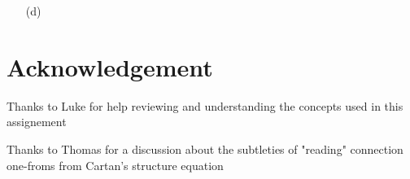 \documentclass[10pt, a4paper]{article}
\begin{document}
{\begin{enumerate}
\begin{align*}
    &=
    \begin{pmatrix}
      0 & H\underline{\omega}^2 \wedge(-B \underline{\omega}^2) + H\underline{\omega}^3 \wedge (-A\underline{\omega}^1)  & H\underline{\omega}^1 \wedge(B \underline{\omega}^2) + H\underline{\omega}^3 \wedge(-A \underline{\omega}^2) & 0\\
      A\underline{\omega}^1 \wedge(H\underline{\omega}^3) & 0 & H\underline{\omega}^1 \wedge(H\underline{\omega}^2) + A\underline{\omega}^1 \wedge(-A \underline{\omega}^2) & H \underline{\omega}^1\wedge(H \underline{\omega}^3)\\
      -B \underline{\omega}^2\wedge(H\underline{\omega}^1) + A\underline{\omega}^2 \wedge(H \underline{\omega}^3) & H \underline{\omega}^2\wedge(H \underline{\omega}^1) + A\underline{\omega}^2\wedge(-A \underline{\omega}^1) & 0 & H\underline{\omega}^2\wedge(H \underline{\omega}^3) -B \underline{\omega}^2 \wedge(A \underline{\omega}^1)\\
      0 & H\underline{\omega}^3\wedge(H \underline{\omega}^1) & H \underline{\omega}^3\wedge(H\underline{\omega}^2) - A\underline{\omega}^1\wedge(B\underline{\omega}^2) & 0
    \end{pmatrix}\\
    &=
    \begin{pmatrix}
      0 & (HA)\underline{\omega}^1 \wedge \underline{\omega}^3  & (HB)\underline{\omega}^1 \wedge\underline{\omega}^2 - (HA)\underline{\omega}^3 \wedge\underline{\omega}^2 & 0\\
      (HA)\underline{\omega}^1 \wedge \underline{\omega}^3 & 0 & (H^2-A^2)\underline{\omega}^1 \wedge \underline{\omega}^2 & (H^2) \underline{\omega}^1\wedge \underline{\omega}^3\\
      (HB) \underline{\omega}^1\wedge \underline{\omega}^2 - (HA)\underline{\omega}^3 \wedge\underline{\omega}^2 & -(H^2-A^2) \underline{\omega}^1\wedge\underline{\omega}^2 & 0 & (H^2)\underline{\omega}^2\wedge \underline{\omega}^3 - (AB) \underline{\omega}^2 \wedge \underline{\omega}^1\\
      0 & -(H^2)\underline{\omega}^1 \wedge \underline{\omega}^3 & -((H^2) \underline{\omega}^2\wedge \underline{\omega}^3 - (AB)\underline{\omega}^2\wedge\underline{\omega}^1) & 0
    \end{pmatrix}
  \end{align*}
  \item[(d)]    
\end{enumerate}

\section{Acknowledgement}

Thanks to Luke for help reviewing and understanding the concepts used in this assignement

Thanks to Thomas for a discussion about the subtleties of "reading" connection one-froms from Cartan's structure equation

}

\makereferences


\end{document}
